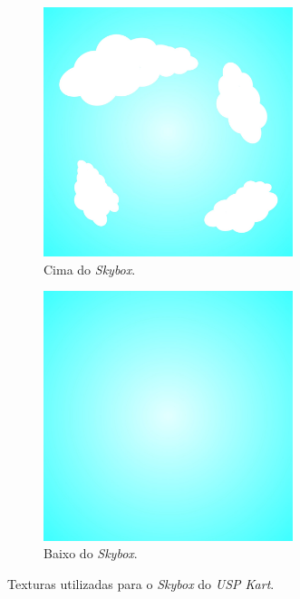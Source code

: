 \begin{figure}[H]
\begin{subfigure}[t]{0.3\textwidth}
        \centering
        \includegraphics[width=0.8\textwidth]{figuras/top.jpg}
        \caption{Cima do \textit{Skybox}.}
    \end{subfigure}
    \hfill
    \begin{subfigure}[t]{0.3\textwidth}
        \centering
        \includegraphics[width=0.8\textwidth]{figuras/bottom.jpg}
        \caption{Baixo do \textit{Skybox}.}
    \end{subfigure}
    \caption{Texturas utilizadas para o \textit{Skybox} do \textit{USP Kart}.}
\end{figure}

